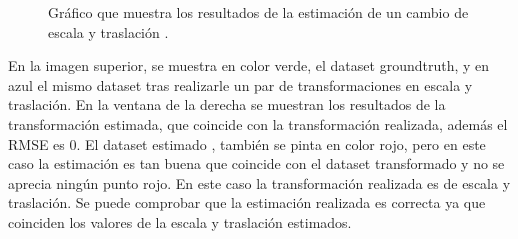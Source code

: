 \begin{figure}
\begin{center}
\hspace{0.5cm}

\end{center}

\caption{Gráfico que muestra los resultados de la estimación de un cambio de escala y traslación .}
\end{figure}

En la imagen superior, se muestra en color verde, el dataset groundtruth, y en azul el mismo dataset tras realizarle un par de transformaciones en escala y traslación.
En la ventana de la derecha se muestran los resultados de la transformación estimada, que coincide con la transformación realizada, además el RMSE es 0.
El dataset estimado , también se pinta en color rojo, pero en este caso la estimación es tan buena que coincide con el dataset transformado y no se aprecia ningún punto rojo.
En este caso la transformación realizada es de escala y traslación. Se puede comprobar que la estimación realizada es correcta ya que coinciden los valores de la escala y traslación estimados.




